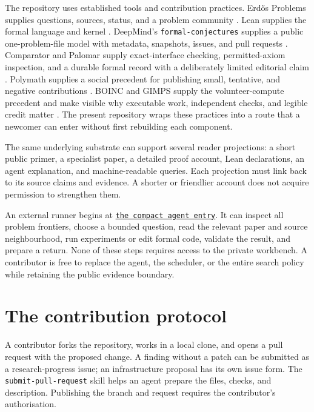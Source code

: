 \documentclass[10pt]{article}
\newcommand{\repobase}{https://github.com/wcook04/plectis-erdos}
\newcommand{\repolink}[2]{\href{\repobase/blob/ca0e13f8acf5ccf48506e4bdb870953d3a0856fa/#1}{\texttt{#2}}}
\begin{document}
The repository uses established tools and contribution practices.  Erd\H{o}s Problems supplies questions, sources, status,
and a problem community \cite{erdosproblems}.  Lean supplies the formal
language and kernel \cite{lean4}.  DeepMind's
\texttt{formal-conjectures} supplies a public one-problem-file model with
metadata, snapshots, issues, and pull requests \cite{formalconjectures}.
Comparator and Palomar supply exact-interface checking, permitted-axiom
inspection, and a durable formal record with a deliberately limited editorial
claim \cite{palomar}.  Polymath supplies a social precedent for publishing
small, tentative, and negative contributions \cite{polymath}.  BOINC and GIMPS
supply the volunteer-compute precedent and make visible why executable work,
independent checks, and legible credit matter \cite{boinc,gimps}.  The present
repository wraps these practices into a route that a newcomer can enter
without first rebuilding each component.

The same underlying substrate can support several reader projections: a short
public primer, a specialist paper, a detailed proof account, Lean declarations,
an agent explanation, and machine-readable queries.  Each projection must link
back to its source claims and evidence.  A shorter or friendlier account does
not acquire permission to strengthen them.

An external runner begins at \repolink{AGENTS.override.md}{the compact agent
entry}.  It can inspect all problem frontiers, choose a bounded question, read
the relevant paper and source neighbourhood, run experiments or edit formal
code, validate the result, and prepare a return.  None of these steps requires
access to the private workbench.  A contributor is free to replace the agent,
the scheduler, or the entire search policy while retaining the public evidence
boundary.

\section{The contribution protocol}\label{sec:protocol}

A contributor forks the repository, works in a local clone, and opens a pull
request with the proposed change. A finding without a patch can be submitted
as a research-progress issue; an infrastructure proposal has its own issue
form. The \texttt{submit-pull-request} skill helps an agent prepare the files,
checks, and description. Publishing the branch and request requires the
contributor's authorisation.
\end{document}
